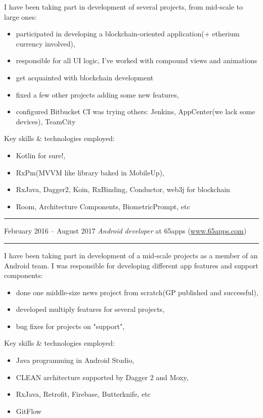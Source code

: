\documentclass[11pt]{article}
\newcommand\CvSmallSkipLength{0.5em}
\newcommand\CvSkip[1]{\vspace{#1}}
\newcommand\CvSmallSkip{\CvSkip{\CvSmallSkipLength}}
\newcommand\CvRule{\begingroup\color{CvRuleColor}\hrule\endgroup}
\newcommand\CvWorkplaceHeader[5]{\begingroup%
  \CvRule%
  \fboxsep0pt%
  \colorbox{CvWorkplaceHeaderColor}{%
    \begin{minipage}{\linewidth-2\fboxsep}%
\CvSmallSkip%
#1 -- #2 \hfill \textit{#3} at #4 (\href{http://#5/}{#5})%
\CvSmallSkip%
    \end{minipage}%
  }%
  \CvRule%
\endgroup%
}
\newenvironment{CvWorkplaceDescription}{%
    \begingroup\setlength\parskip{\CvSmallSkipLength}%
  }{%
    \CvSmallSkip\endgroup%
  }
\begin{document}
\begin{CvWorkplaceDescription}
I have been taking part in development of several projects, from mid-scale to large ones:
\begin{itemize}[noitemsep]
  \item participated in developing a blockchain-oriented application(+ etherium currency involved),
  \item responsible for all UI logic, I've worked with compound views and animations
  \item get acquainted with blockchain development
  \item fixed a few other projects adding some new features,
  \item configured Bitbucket CI was trying others: Jenkins, AppCenter(we lack some devices), TeamCity\
\end{itemize}

Key skills \& technologies employed:
\begin{itemize}[noitemsep]
  \item Kotlin for sure!,
  \item RxPm(MVVM like library baked in MobileUp),
  \item RxJava, Dagger2, Koin, RxBinding, Conductor, web3j for blockchain
  \item Room, Architecture Components, BiometricPrompt, etc
\end{itemize}
\end{CvWorkplaceDescription}

\CvWorkplaceHeader{February 2016}{August 2017}{Android developer}{65apps}{www.65apps.com}

\begin{CvWorkplaceDescription}
I have been taking part in development of a mid-scale projects as a member of an Android team. I was responsible for developing different app features and support components:
\begin{itemize}[noitemsep]
  \item done one middle-size news project from scratch(GP published and successful),
  \item developed multiply features for several projects,
  \item bug fixes for projects on "support",
\end{itemize}

Key skills \& technologies employed:
\begin{itemize}[noitemsep]
  \item Java programming in Android Studio,
  \item CLEAN architecture supported by Dagger 2 and Moxy,
  \item RxJava, Retrofit, Firebase, Butterknife, etc
  \item GitFlow
\end{itemize}
\end{CvWorkplaceDescription}
\end{document}
